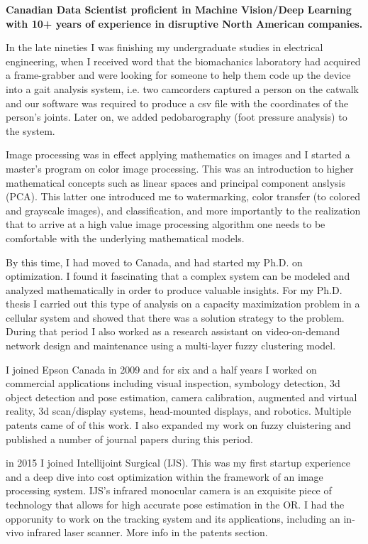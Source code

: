 \onehalfspace
\textbf{\large Canadian Data Scientist proficient in Machine Vision/Deep Learning with 10+ years of experience in 
disruptive North American companies.}
\singlespace

\vspace{1cm}

In the late nineties I was finishing my undergraduate studies in electrical engineering, when I received word that
the biomachanics laboratory had acquired a frame-grabber and were looking for someone to help them code up the device
into a gait analysis system, i.e. two camcorders captured a person on the catwalk and our software was required to produce 
a csv file with the coordinates of the person's joints. Later on, we added pedobarography (foot pressure analysis) to the 
system. 

Image processing was in effect applying mathematics on images and I started a master's program on color image processing. 
This was an introduction to higher mathematical concepts such as linear spaces and principal component anslysis (PCA). This
latter one introduced me to watermarking, color transfer (to colored and grayscale images), and classification, and more 
importantly to the realization that to arrive at a high value image processing algorithm one needs to be comfortable with
the underlying mathematical models. 

By this time, I had moved to Canada, and had started my Ph.D. on optimization. I found it fascinating that a complex system can be 
modeled and analyzed mathematically in order to produce valuable insights. For my Ph.D. thesis I carried out this type of 
analysis on a capacity maximization problem in a cellular system and showed that there was a solution strategy to the problem. 
During that period I also worked as a research assistant on video-on-demand network design and maintenance using a multi-layer 
fuzzy clustering model.

I joined Epson Canada in 2009 and for six and a half years I worked on commercial applications including visual inspection, 
symbology detection, 3d object detection and pose estimation, camera calibration, augmented and virtual reality, 3d scan/display 
systems, head-mounted displays, and robotics. Multiple patents came of of this work. I also expanded my work on fuzzy cluistering 
and published a number of journal papers during this period.

in 2015 I joined Intellijoint Surgical (IJS). This was my first startup experience and a deep dive into cost optimization within 
the framework of an image processing system. IJS's infrared monocular camera is an exquisite piece of technology that allows for 
high accurate pose estimation in the OR. I had the opporunity to work on the tracking system and its applications, including 
an in-vivo infrared laser scanner. More info in the patents section.

